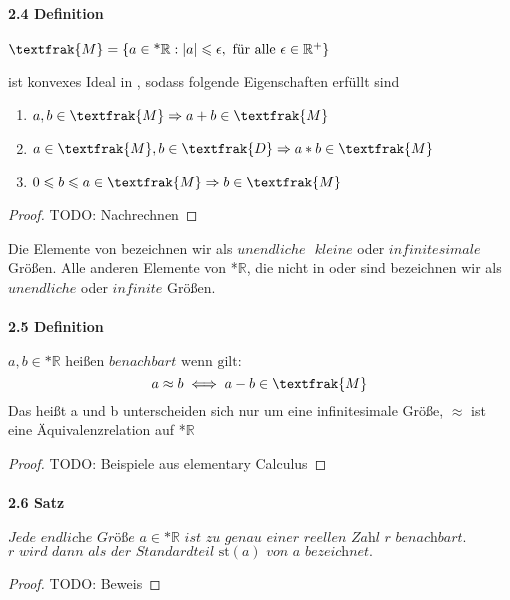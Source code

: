 \documentclass[a4paper]{article}
\begin{document}
\paragraph{2.4 Definition} $ \textfrak{M} = \{a \in \text{*}\mathbb{R}: |a| \leqslant \epsilon, \text{ für alle } \epsilon \in \mathbb{R}^+ \} $

\bigskip
{} ist konvexes Ideal in , sodass folgende Eigenschaften erfüllt sind 
\begin{enumerate}
      \item $a,b \in \textfrak{M} \Rightarrow a + b \in \textfrak{M} $ 
      \item $a \in \textfrak{M}, b \in \textfrak{D} \Rightarrow a * b \in \textfrak{M} $ 
      \item $0 \leqslant b \leqslant a \in \textfrak{M} \Rightarrow b \in \textfrak{M} $ 
\end{enumerate}
\begin{proof}
      TODO: Nachrechnen
\end{proof}

Die Elemente von  bezeichnen wir als $ unendliche \text{ } kleine $ oder $ infinitesimale $ Größen. 
Alle anderen Elemente von *$\mathbb{R}$, die nicht in  oder  sind bezeichnen wir als $ unendliche $ oder $ infinite $ Größen.

\paragraph{2.5 Definition} $a,b \in \text{*}\mathbb{R} \text{ heißen } benachbart \text{ wenn gilt:} $
$$a \approx b \iff a - b \in \textfrak{M}$$
Das heißt a und b unterscheiden sich nur um eine infinitesimale Größe, $\approx$ ist eine Äquivalenzrelation auf *$\mathbb{R}$
\begin{proof}
      TODO: Beispiele aus elementary Calculus
\end{proof}

\paragraph{2.6 Satz} $ \textit{Jede endliche Größe } a \in \text{*}\mathbb{R} \textit{ ist zu genau einer reellen Zahl r benachbart.}$
$ \textit{r wird dann als der Standardteil } \text{st}(a) \textit{ von a bezeichnet.} $
\begin{proof}
      TODO: Beweis 
\end{proof}
\end{document}
